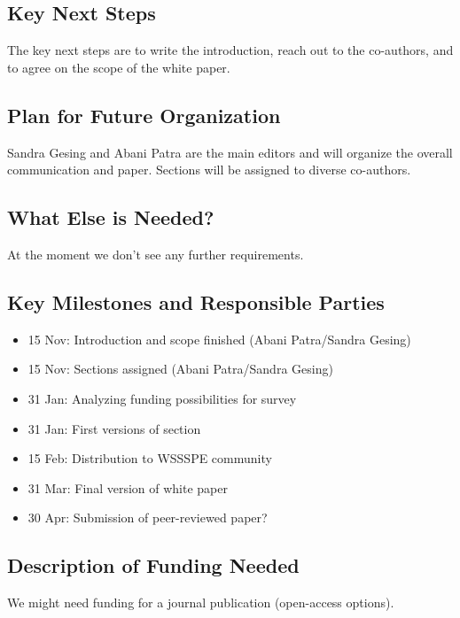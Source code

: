 \subsection{Key Next Steps}

The key next steps are to write the introduction, reach out to the co-authors, and to agree on the scope of the white paper.

\subsection{Plan for Future Organization}

Sandra Gesing and Abani Patra are the main editors and will organize the overall communication and paper. Sections will be assigned to diverse co-authors.

\subsection{What Else is Needed?}

At the moment we don't see any further requirements.

\subsection{Key Milestones and Responsible Parties}
\begin{itemize}
\item 15 Nov: Introduction and scope finished (Abani Patra/Sandra Gesing)
\item 15 Nov: Sections assigned (Abani Patra/Sandra Gesing)
\item 31 Jan: Analyzing funding possibilities for survey
\item 31 Jan: First versions of section
\item 15 Feb: Distribution to WSSSPE community
\item 31 Mar: Final version of white paper
\item 30 Apr: Submission of peer-reviewed paper?
\end{itemize}

\subsection{Description of Funding Needed}
We might need funding for a journal publication (open-access options).
